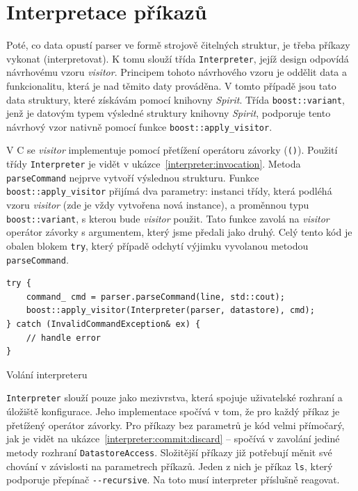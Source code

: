 \documentclass[thesis=B,czech,hidelinks]{FITthesis}[2019/03/06]
\newcommand{\Rplus}{\protect\hspace{-.1em}\protect\raisebox{.35ex}{\smaller{\smaller\textbf{+}}}}
\newcommand{\Cpp}{\mbox{C\Rplus\Rplus}\xspace}
\begin{document}
\section{Interpretace příkazů}\label{interpreter}
Poté, co data opustí parser ve formě strojově čitelných struktur, je třeba příkazy vykonat (interpretovat). K tomu slouží třída \texttt{Interpreter}, jejíž design odpovídá návrhovému vzoru \textit{visitor}. Principem tohoto návrhového vzoru je oddělit data a funkcionalitu, která je nad těmito daty prováděna. V tomto případě jsou tato data struktury, které získávám pomocí knihovny \textit{Spirit}. Třída \texttt{boost::variant}, jenž je datovým typem výsledné struktury knihovny \textit{Spirit}, podporuje tento návrhový vzor nativně pomocí funkce \texttt{boost::apply\_visitor}.

V \Cpp{} se \textit{visitor} implementuje pomocí přetížení operátoru závorky (\texttt{()}). Použití třídy \texttt{Interpreter} je vidět v ukázce~\ref{interpreter:invocation}. Metoda \texttt{parseCommand} nejprve vytvoří výslednou strukturu. Funkce \texttt{boost::apply\_visitor} přijímá dva parametry: instanci třídy, která podléhá vzoru \textit{visitor} (zde je vždy vytvořena nová instance), a proměnnou typu \texttt{boost::variant}, s kterou bude \textit{visitor} použit. Tato funkce zavolá na \textit{visitor} operátor závorky s argumentem, který jsme předali jako druhý. Celý tento kód je obalen blokem \texttt{try}, který případě odchytí výjimku vyvolanou metodou \texttt{parseCommand}.

\begin{listing}
\begin{verbatim}
try {
    command_ cmd = parser.parseCommand(line, std::cout);
    boost::apply_visitor(Interpreter(parser, datastore), cmd);
} catch (InvalidCommandException& ex) {
    // handle error
}
\end{verbatim}
\caption{Volání interpreteru}\label{interpreter:invocation}
\end{listing}

\texttt{Interpreter} slouží pouze jako mezivrstva, která spojuje uživatelské rozhraní a úložiště konfigurace. Jeho implementace spočívá v tom, že pro každý příkaz je přetížený operátor závorky. Pro příkazy bez parametrů je kód velmi přímočarý, jak je vidět na ukázce~\ref{interpreter:commit:discard} -- spočívá v zavolání jediné metody rozhraní \texttt{DatastoreAccess}. Složitější příkazy již potřebují měnit své chování v závislosti na parametrech příkazů. Jeden z nich je příkaz \texttt{ls}, který podporuje přepínač \verb¨--recursive¨. Na toto musí interpreter příslušně reagovat.
\end{document}
